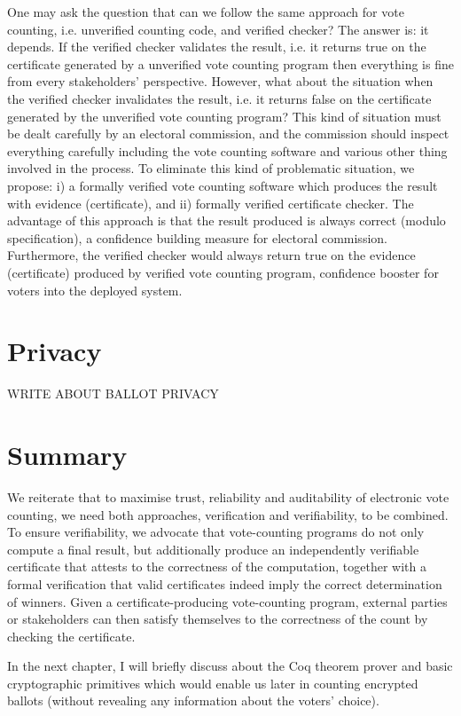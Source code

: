    One may ask the question that can we follow the same approach for vote counting,
   i.e. unverified counting code, and verified checker?  The answer is: it depends. 
   If the verified checker validates the result, i.e. it returns true on  
   the certificate generated by a unverified 
   vote counting program then everything is fine from every stakeholders' perspective.
   However, what about the situation when the verified checker invalidates the result, i.e. 
   it returns false on the certificate generated by the unverified vote counting program? 
   This kind of situation must be dealt carefully by an electoral commission, and the commission should
   inspect everything carefully including the vote counting software and various other thing involved in the
   process.
   To eliminate this kind of problematic situation, we propose: i) a formally verified vote counting
   software which produces the result with evidence (certificate), and ii) formally verified 
   certificate checker. The advantage of this approach is that the result produced is always correct (modulo 
   specification), a confidence building measure for electoral commission. Furthermore, the verified checker would 
   always return true on the evidence (certificate) produced by verified vote counting program, confidence booster for 
   voters into the deployed system.  
  

  
  
\section{Privacy}
  WRITE ABOUT BALLOT PRIVACY
    
   
\section{Summary}
\label{secback:summary_back}
We reiterate that to maximise trust, reliability and auditability of electronic vote counting, we
need both approaches, verification and verifiability, to be combined. To ensure
verifiability, we advocate that vote-counting programs
do not only compute a final result, but additionally produce an
independently verifiable certificate that attests to the correctness
of the computation, together with a formal verification that
valid certificates indeed imply the correct determination of
winners. Given a certificate-producing vote-counting program, external
parties or stakeholders can then satisfy themselves to the
correctness of the count by checking the certificate.    

In the next chapter, I will  briefly discuss about the Coq theorem prover and basic cryptographic primitives which 
would enable us later in counting encrypted ballots (without revealing any information about the
voters' choice).